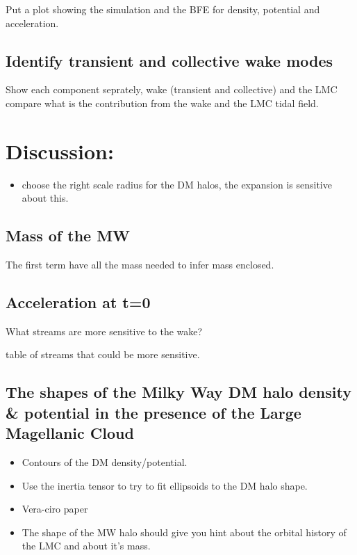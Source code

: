 \documentclass[twocolumn]{aastex62}
\begin{document}
Put a plot showing the simulation and the BFE for density, potential and
acceleration.

\subsection{Identify transient and collective wake modes}

Show each component seprately, wake (transient and collective) and the LMC
compare what is the contribution from the wake and the LMC tidal field.



\section{Discussion:}

\begin{itemize}
  \item  choose the right scale radius for the DM halos, the expansion is sensitive about this.
\end{itemize}

\subsection{Mass of the MW}

The first term have all the mass needed to infer mass enclosed.


\subsection{Acceleration at t=0}

What streams are more sensitive to the wake?

table of streams that could be more sensitive.


\subsection{The shapes of the Milky Way DM halo density \& potential in the
presence of the Large Magellanic Cloud}

\begin{itemize}
  \item Contours of the DM density/potential.
  \item Use the inertia tensor to try to fit ellipsoids to the DM halo shape. 
  \item Vera-ciro paper
  \item The shape of the MW halo should give you hint about the orbital history
    of the LMC and about it's mass.
\end{itemize}
\end{document}
